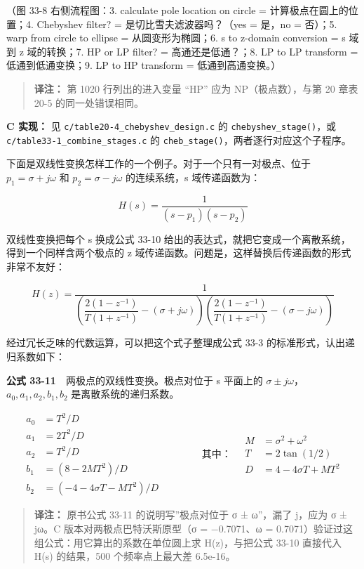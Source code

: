 （图 33-8 右侧流程图：3. calculate pole location on circle =
计算极点在圆上的位置；4. Chebyshev filter? = 是切比雪夫滤波器吗？（yes =
是，no = 否）；5. warp from circle to ellipse = 从圆变形为椭圆；6. s to
z-domain conversion = s 域到 z 域的转换；7. HP or LP filter? =
高通还是低通？；8. LP to LP transform = 低通到低通变换；9. LP to HP
transform = 低通到高通变换。）

\begin{quote}
\textbf{译注：} 第 1020 行列出的进入变量 ``HP'' 应为 NP（极点数），与第
20 章表 20-5 的同一处错误相同。
\end{quote}

\textbf{C 实现：} 见 \texttt{c/table20-4\_chebyshev\_design.c} 的
\texttt{chebyshev\_stage()}，或 \texttt{c/table33-1\_combine\_stages.c}
的 \texttt{cheb\_stage()}，两者逐行对应这个子程序。

下面是双线性变换怎样工作的一个例子。对于一个只有一对极点、位于
\(p_1 = \sigma + j\omega\) 和 \(p_2 = \sigma - j\omega\) 的连续系统，s
域传递函数为：

\[H(s) = \frac{1}{(s - p_1)(s - p_2)}\]

双线性变换把每个 s 换成公式 33-10
给出的表达式，就把它变成一个离散系统，得到一个同样含两个极点的 z
域传递函数。问题是，这样替换后传递函数的形式非常不友好：

\[H(z) = \frac{1}{\left(\dfrac{2(1 - z^{-1})}{T(1 + z^{-1})} - (\sigma + j\omega)\right)\left(\dfrac{2(1 - z^{-1})}{T(1 + z^{-1})} - (\sigma - j\omega)\right)}\]

经过冗长乏味的代数运算，可以把这个式子整理成公式 33-3
的标准形式，认出递归系数如下：

\textbf{公式 33-11}　两极点的双线性变换。极点对位于 s 平面上的
\(\sigma \pm j\omega\)，\(a_0, a_1, a_2, b_1, b_2\)
是离散系统的递归系数。

\[\begin{aligned}
a_0 &= T^2/D \\
a_1 &= 2T^2/D \\
a_2 &= T^2/D \\
b_1 &= (8 - 2MT^2)/D \\
b_2 &= (-4 - 4\sigma T - MT^2)/D
\end{aligned}
\qquad\qquad
\text{其中：}\quad
\begin{aligned}
M &= \sigma^2 + \omega^2 \\
T &= 2\tan(1/2) \\
D &= 4 - 4\sigma T + MT^2
\end{aligned}\]

\begin{quote}
\textbf{译注：} 原书公式 33-11 的说明写''极点对位于 σ ± ω''，漏了
j，应为 σ ± jω。C 版本对两极点巴特沃斯原型（σ = −0.7071、ω =
0.7071）验证过这组公式：用它算出的系数在单位圆上求 H(z)，与把公式 33-10
直接代入 H(s) 的结果，500 个频率点上最大差 6.5e-16。
\end{quote}

